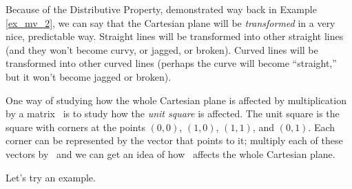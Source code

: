 %
%
%


Because of the Distributive Property, demonstrated way back in Example \ref{ex_mv_2}, we can say that the Cartesian plane will be \textit{transformed} in a very nice, predictable way. Straight lines will be transformed into other straight lines (and they won't become curvy, or jagged, or broken). Curved lines will be transformed into other curved lines (perhaps the curve will become ``straight,'' but it won't become jagged or broken).

One way of studying how the whole Cartesian plane is affected by multiplication by a matrix \tta\ is to study how the \textit{unit square} is affected. The unit square is the square with corners at the points $(0,0)$, $(1,0)$, $(1,1)$, and $(0,1)$. Each corner can be represented by the vector that points to it; multiply each of these vectors by \tta\ and we can get an idea of how \tta\ affects the whole Cartesian plane. 

Let's try an example.

\medskip


